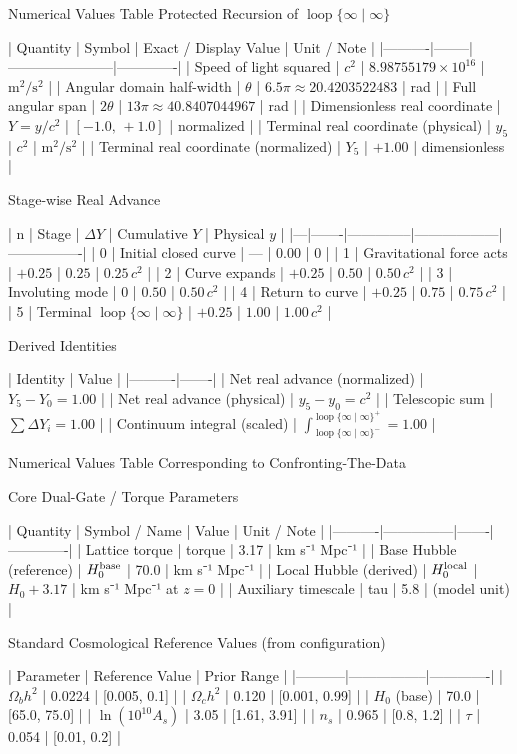 Numerical Values Table  
Protected Recursion of \(\operatorname{loop}\{\infty\mid\infty\}\)

| Quantity | Symbol | Exact / Display Value | Unit / Note |
|----------|--------|-----------------------|-------------|
| Speed of light squared | \(c^2\) | \(8.98755179 \times 10^{16}\) | \(\mathrm{m}^2/\mathrm{s}^2\) |
| Angular domain half-width | \(\theta\) | \(6.5\pi \approx 20.4203522483\) | rad |
| Full angular span | \(2\theta\) | \(13\pi \approx 40.8407044967\) | rad |
| Dimensionless real coordinate | \(Y = y/c^2\) | \([-1.0,\,+1.0]\) | normalized |
| Terminal real coordinate (physical) | \(y_5\) | \(c^2\) | \(\mathrm{m}^2/\mathrm{s}^2\) |
| Terminal real coordinate (normalized) | \(Y_5\) | \(+1.00\) | dimensionless |

Stage-wise Real Advance

| n | Stage | \(\Delta Y\) | Cumulative \(Y\) | Physical \(y\) |
|---|-------|--------------|------------------|----------------|
| 0 | Initial closed curve | — | \(0.00\) | \(0\) |
| 1 | Gravitational force acts | \(+0.25\) | \(0.25\) | \(0.25\,c^2\) |
| 2 | Curve expands | \(+0.25\) | \(0.50\) | \(0.50\,c^2\) |
| 3 | Involuting mode | \(0\) | \(0.50\) | \(0.50\,c^2\) |
| 4 | Return to curve | \(+0.25\) | \(0.75\) | \(0.75\,c^2\) |
| 5 | Terminal \(\operatorname{loop}\{\infty\mid\infty\}\) | \(+0.25\) | \(1.00\) | \(1.00\,c^2\) |

Derived Identities

| Identity | Value |
|----------|-------|
| Net real advance (normalized) | \(Y_5 - Y_0 = 1.00\) |
| Net real advance (physical) | \(y_5 - y_0 = c^2\) |
| Telescopic sum | \(\sum\Delta Y_i = 1.00\) |
| Continuum integral (scaled) | \(\displaystyle\int_{\operatorname{loop}\{\infty\mid\infty\}^{-}}^{\operatorname{loop}\{\infty\mid\infty\}^{+}} = 1.00\) |

Numerical Values Table  
Corresponding to Confronting-The-Data

Core Dual-Gate / Torque Parameters

| Quantity | Symbol / Name | Value | Unit / Note |
|----------|---------------|-------|-------------|
| Lattice torque | torque | 3.17 | km s⁻¹ Mpc⁻¹ |
| Base Hubble (reference) | \(H_0^{\rm base}\) | 70.0 | km s⁻¹ Mpc⁻¹ |
| Local Hubble (derived) | \(H_0^{\rm local}\) | \(H_0 + 3.17\) | km s⁻¹ Mpc⁻¹ at \(z=0\) |
| Auxiliary timescale | tau | 5.8 | (model unit) |

Standard Cosmological Reference Values (from configuration)

| Parameter | Reference Value | Prior Range |
|-----------|-----------------|-------------|
| \(\Omega_b h^2\) | 0.0224 | [0.005, 0.1] |
| \(\Omega_c h^2\) | 0.120 | [0.001, 0.99] |
| \(H_0\) (base) | 70.0 | [65.0, 75.0] |
| \(\ln(10^{10}A_s)\) | 3.05 | [1.61, 3.91] |
| \(n_s\) | 0.965 | [0.8, 1.2] |
| \(\tau\) | 0.054 | [0.01, 0.2] |

